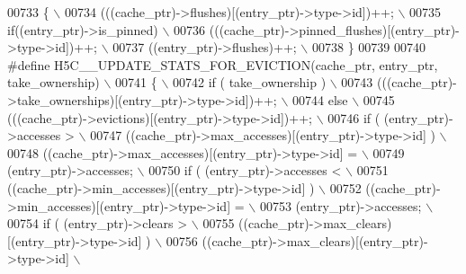 \begin{DoxyCode}
00733 \textcolor{preprocessor}{\{                                                                 \(\backslash\)}
00734 \textcolor{preprocessor}{    (((cache\_ptr)->flushes)[(entry\_ptr)->type->id])++;            \(\backslash\)}
00735 \textcolor{preprocessor}{    if((entry\_ptr)->is\_pinned)                                    \(\backslash\)}
00736 \textcolor{preprocessor}{        (((cache\_ptr)->pinned\_flushes)[(entry\_ptr)->type->id])++; \(\backslash\)}
00737 \textcolor{preprocessor}{    ((entry\_ptr)->flushes)++;                                     \(\backslash\)}
00738 \textcolor{preprocessor}{\}}
00739 
00740 \textcolor{preprocessor}{#define H5C\_\_UPDATE\_STATS\_FOR\_EVICTION(cache\_ptr, entry\_ptr, take\_ownership) \(\backslash\)}
00741 \textcolor{preprocessor}{\{                                                                            \(\backslash\)}
00742 \textcolor{preprocessor}{    if ( take\_ownership )                                                    \(\backslash\)}
00743 \textcolor{preprocessor}{        (((cache\_ptr)->take\_ownerships)[(entry\_ptr)->type->id])++;           \(\backslash\)}
00744 \textcolor{preprocessor}{    else                                                                     \(\backslash\)}
00745 \textcolor{preprocessor}{        (((cache\_ptr)->evictions)[(entry\_ptr)->type->id])++;                 \(\backslash\)}
00746 \textcolor{preprocessor}{    if ( (entry\_ptr)->accesses >                                         \(\backslash\)}
00747 \textcolor{preprocessor}{            ((cache\_ptr)->max\_accesses)[(entry\_ptr)->type->id] )         \(\backslash\)}
00748 \textcolor{preprocessor}{        ((cache\_ptr)->max\_accesses)[(entry\_ptr)->type->id] =             \(\backslash\)}
00749 \textcolor{preprocessor}{            (entry\_ptr)->accesses;                                       \(\backslash\)}
00750 \textcolor{preprocessor}{    if ( (entry\_ptr)->accesses <                                         \(\backslash\)}
00751 \textcolor{preprocessor}{            ((cache\_ptr)->min\_accesses)[(entry\_ptr)->type->id] )         \(\backslash\)}
00752 \textcolor{preprocessor}{        ((cache\_ptr)->min\_accesses)[(entry\_ptr)->type->id] =             \(\backslash\)}
00753 \textcolor{preprocessor}{            (entry\_ptr)->accesses;                                       \(\backslash\)}
00754 \textcolor{preprocessor}{    if ( (entry\_ptr)->clears >                                           \(\backslash\)}
00755 \textcolor{preprocessor}{             ((cache\_ptr)->max\_clears)[(entry\_ptr)->type->id] )          \(\backslash\)}
00756 \textcolor{preprocessor}{            ((cache\_ptr)->max\_clears)[(entry\_ptr)->type->id]             \(\backslash\)}

\end{DoxyCode}
